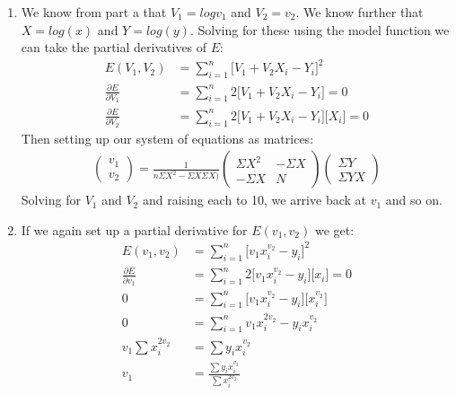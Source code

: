 \documentclass[11pt,a4paper]{article}
\begin{document}
\begin{itemize}
\begin{enumerate} [label={\alph*)}]
					\item We know from part a that $V_1 = logv_1$ and $V_2 = v_2$. We know further that $X = log(x)$ and $Y = log(y)$. Solving for these using the model function we can take the partial derivatives of $E$:
					\begin{align*}
						E(V_1,V_2) &= \sum\limits_{i=1}^n \Big[V_1 + V_2X_i - Y_i\Big]^2 \\
						\frac{\partial E}{\partial V_1} &= \sum\limits_{i=1}^n 2\Big[V_1 + V_2X_i - Y_i\Big] = 0\\
						\frac{\partial E}{\partial V_2} &= \sum\limits_{i=1}^n 2\Big[V_1 + V_2X_i - Y_i\Big]\Big[X_i\Big] = 0
					\end{align*}
					Then setting up our system of equations as matrices:
					\begin{align*}
						\begin{pmatrix} v_1 \\ v_2 \end{pmatrix} = \frac{1}{n\Sigma X^2 - \Sigma X \Sigma X \big)}\begin{pmatrix} 
						\Sigma X^2 & -\Sigma X \\
						-\Sigma X & N
						\end{pmatrix}\begin{pmatrix}
						\Sigma Y \\
						\Sigma YX
						\end{pmatrix}
					\end{align*}
					Solving for $V_1$ and $V_2$ and raising each to 10, we arrive back at $v_1$ and so on.
					\item If we again set up a partial derivative for $E(v_1,v_2)$ we get:
					\begin{align*}
						E(v_1,v_2) &= \sum\limits_{i=1}^n \Big[v_1x_i^{v_2}-y_i\Big]^2 \\
						\frac{\partial E}{\partial v_1} &= \sum\limits_{i=1}^n 2\Big[v_1x_i^{v_2}-y_i\Big]\Big[x_i\Big] = 0 \\
						0 &= \sum\limits_{i=1}^n \Big[v_1x_i^{v_2}-y_i\Big]\Big[x_i^{v_2}\Big] \\
						0 &= \sum\limits_{i=1}^n v_1x_i^{2v_2}-y_ix_i^{v_2} \\
						v_1\sum x_i^{2v_2} &= \sum y_ix_i^{v_2} \\
						v_1 &= \frac{\sum y_ix_i^{v_2}}{\sum x_i^{2v_2}}
					\end{align*}
					

\end{enumerate}
\end{itemize}
\end{document}
